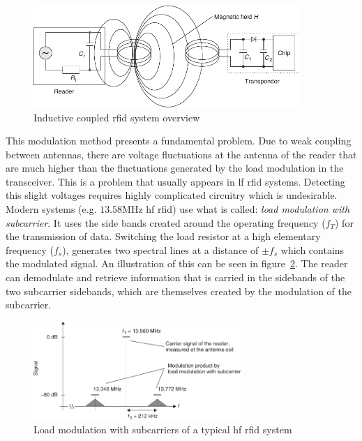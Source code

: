 \begin{figure}[!ht]
    \centering
    \includegraphics[width=0.9\textwidth]{./figs/02-state-of-the-art/loadmodulation.pdf}
    \caption{Inductive coupled \ac{rfid} system overview~\cite{finkenzellerRFIDHandbookFundamentals2003}} 
    \label{fig:loadmodulation}
\end{figure}

This modulation method presents a fundamental problem. Due to weak coupling between antennas, there are voltage fluctuations at the antenna of the reader that are much higher than the fluctuations generated by the load modulation in the transceiver. This is a problem that usually appears in \ac{lf} \ac{rfid} systems. Detecting this slight voltages requires highly complicated circuitry which is undesirable.
Modern systems (e.g. $13.58$MHz \ac{hf} \ac{rfid}) use what is called: \emph{load modulation with subcarrier}. It uses the side bands created around the operating frequency ($f_T$) for the transmission of data. Switching the load resistor at a high elementary frequency ($f_s$), generates two spectral lines at a distance of $\pm f_s$ which contains the modulated signal. An illustration of this can be seen in figure~\ref{fig:loadmodulationsidebands}. The reader can demodulate and retrieve information that is carried in the sidebands of the two subcarrier sidebands, which are themselves created by the modulation of the subcarrier.

\begin{figure}[!ht]
    \centering
    \includegraphics[width=0.7\textwidth]{./figs/02-state-of-the-art/loadmodulation_sidebands.pdf}
    \caption{Load modulation with subcarriers of a typical \ac{hf} \ac{rfid} system~\cite{finkenzellerRFIDHandbookFundamentals2003}} 
    \label{fig:loadmodulationsidebands}
\end{figure}

